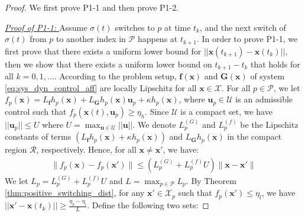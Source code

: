 \documentclass[10pt,a4paper]{amsart}
\begin{document}
\begin{proof}
    We first prove P1-1 and then prove P1-2.

    \textit{\underline{Proof of P1-1: }} Assume $\sigma(t)$ switches to $p$ at time $t_k$, and the next switch of $\sigma(t)$ from $p$ to another index in $\mathcal{P}$ happens at $t_{k+1}$. In order to prove P1-1, we first prove that there exists a uniform lower bound for $||\mathbf{x}(t_{k+1}) - \mathbf{x}(t_k)||$, then we show that there exists a uniform lower bound on $t_{k+1}-t_{k}$ that holds for all $k=0,1,\ldots$. According to the problem setup, $\mathbf{f}(\mathbf{x})$ and $\mathbf{G}(\mathbf{x})$ of system \eqref{eq:sys_dyn_control_aff} are locally Lipschitz for all $\mathbf{x}\in\mathcal{X}$. 
    For all $p\in\mathcal{P}$, we let $f_p(\mathbf{x})=L_\mathbf{f}h_p(\mathbf{x}) + L_{\mathbf{G}}h_p(\mathbf{x})\mathbf{u}_p+\kappa h_p(\mathbf{x})$, where $\mathbf{u}_p\in\mathcal{U}$ is an admissible control such that $f_p(\mathbf{x}(t), \mathbf{u}_p)\geq \eta_h$. Since $\mathcal{U}$ is a compact set, we have $||\mathbf{u}_p||\leq U$ where $U=\max_{\mathbf{u}\in\mathcal{U}}||\mathbf{u}||$. We denote $L_{p}^{(G)}$ and $L_{p}^{(f)}$ be the Lipschitz constants of terms $(L_\mathbf{f}h_p(\mathbf{x})+\kappa h_p(\mathbf{x}))$ and $L_{\mathbf{G}}h_p(\mathbf{x})$ in the compact region $\mathcal{R}$, respectively. Hence, for all $\mathbf{x}\neq\mathbf{x}'$, we have:
    \begin{align*}
         \|f_p(\mathbf{x}) - f_p(\mathbf{x}')\|
         \leq (L_p^{(G)} + L_p^{(f)}U)\|\mathbf{x}-\mathbf{x}'\|
    \end{align*}
    We let $L_p = L_p^{(G)} + L_p^{(f)}U$ and $L=\max_{p\in\mathcal{P}}L_p$. 
    By Theorem \ref{thm:positive_switching_dist}, for any $\mathbf{x}'\in\mathcal{X}_p$ such that $f_{p}(\mathbf{x}')\leq \eta_l$, we have $||\mathbf{x}' - \mathbf{x}(t_k)||\geq \frac{\eta_h-\eta_l}{L}$. Define the following two sets: 

\end{proof}
\end{document}
